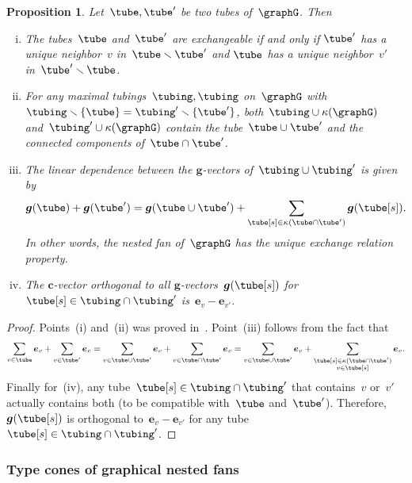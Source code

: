 \documentclass{amsart}
\newtheorem{proposition}[theorem]{Proposition}
\theoremstyle{definition}
\renewcommand{\b}[1]{{\boldsymbol{#1}}} %
\newcommand{\ssm}{\smallsetminus} %
\newcommand{\gvector}[1]{\b{g}(#1)} %
\newcommand{\connectedComponents}{\kappa} %
\begin{document}
\begin{proposition}
\label{prop:exchangeablePairsGA}
Let~$\tube, \tube'$ be two tubes of~$\graphG$. Then
\begin{enumerate}[(i)]
\item The tubes~$\tube$ and~$\tube'$ are exchangeable if and only if $\tube'$ has a unique neighbor~$v$ in~$\tube \ssm \tube'$ and $\tube$ has a unique neighbor~$v'$ in~$\tube' \ssm \tube$.
\item For any maximal tubings~$\tubing, \tubing$ on~$\graphG$ with $\tubing \ssm \{\tube\} = \tubing' \ssm \{\tube'\}$, both~$\tubing \cup \connectedComponents(\graphG)$ and~$\tubing' \cup \connectedComponents(\graphG)$ contain the tube~$\tube \cup \tube'$ and the connected components of~$\tube \cap \tube'$.
\item The linear dependence between the $\b{g}$-vectors of~$\tubing \cup \tubing'$ is given by
\[
\gvector{\tube} + \gvector{\tube'} = \gvector{\tube \cup \tube'} + \sum_{\tube[s] \in \connectedComponents(\tube \cap \tube')} \gvector{\tube[s]}.
\]
In other words, the nested fan of~$\graphG$ has the unique exchange relation property.
\item The $\b{c}$-vector orthogonal to all $\b{g}$-vectors~$\gvector{\tube[s]}$ for~$\tube[s] \in \tubing \cap \tubing'$ is~$\b{e}_v - \b{e}_{v'}$.
\end{enumerate}
\end{proposition}

\begin{proof}
Points~(i) and~(ii) was proved in~\cite{MannevillePilaud-compatibilityFans}. Point~(iii) follows from the fact that
\[
\sum_{v \in \tube} \b{e}_v + \sum_{v \in \tube'} \b{e}_v = \sum_{v \in \tube \cup \tube'} \b{e}_v + \sum_{v \in \tube \cap \tube'} \b{e}_v = \sum_{v \in \tube \cup \tube'} \b{e}_v + \sum_{\substack{\tube[s] \in \connectedComponents(\tube \cap \tube') \\ v \in \tube[s]}} \b{e}_v.
\]
Finally for~(iv), any tube~$\tube[s] \in \tubing \cap \tubing'$ that contains~$v$ or~$v'$ actually contains both (to be compatible with~$\tube$ and~$\tube'$). Therefore, $\gvector{\tube[s]}$ is orthogonal to~$\b{e}_v - \b{e}_{v'}$ for any tube~$\tube[s] \in \tubing \cap \tubing'$.
\end{proof}


\subsubsection{Type cones of graphical nested fans}
\end{document}
